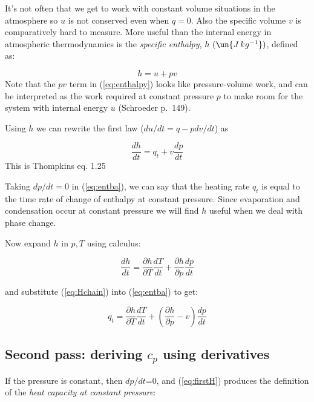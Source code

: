 \documentclass[12pt]{article}
\begin{document}
It's not often that we get to work with constant volume situations in
the atmosphere so $u$ is not conserved even when $q=0$.  Also the
specific volume $v$ is comparatively hard to measure.
More useful than the internal energy in atmospheric thermodynamics is
the \textit{specific enthalpy}, $h\ (\un{J\,kg^{-1}})$, defined as:

\begin{equation}
  \label{eq:enthalpy}
  h  = u + pv
\end{equation}
Note that the $p v$ term in (\ref{eq:enthalpy}) looks like pressure-volume
work, and can be interpreted as the work required at constant pressure $p$
to make room for the system with internal energy $u$ (Schroeder p.~149).

Using $h$ we can rewrite the first law ($du/dt = q - p dv/dt$) as

\begin{equation}
  \label{eq:entba}
  \frac{dh}{dt} = q_t   + v \frac{dp}{dt}
\end{equation}
This  is Thompkins eq. 1.25


Taking $dp/dt=0$ in (\ref{eq:entba}), we can say that the heating rate
$q_t$ is equal to the time rate of change of enthalpy at constant
pressure.  Since evaporation and condensation occur at constant
pressure we will find $h$ useful when we deal with phase change.

Now expand $h$ in $p,T$ using calculus:

\begin{equation}
  \label{eq:Hchain}
  \frac{dh}{dt} = \frac{\partial h}{\partial T} \frac{dT}{dt} + 
                  \frac{\partial h}{\partial p} \frac{dp}{dt}
\end{equation}

and substitute (\ref{eq:Hchain}) into (\ref{eq:entba}) to get:

\begin{equation}
  \label{eq:firstH}
  q_t = \frac{\partial h}{\partial T} \frac{dT}{dt} + \left ( \frac{\partial h}{\partial p} - v 
                        \right ) \frac{dp}{dt}
\end{equation}


\subsection{Second pass:  deriving $c_p$ using derivatives}
\label{sec:second-pass:-c_p}



If the pressure is constant, then $dp/dt$=0, and (\ref{eq:firstH})
produces the definition of the \textit{heat capacity at constant
  pressure}:
\end{document}
